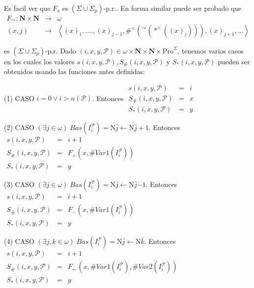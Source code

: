 Es facil ver que \(F_{a}\) es \((\Sigma \cup \Sigma _{p})\)-p.r.. En forma similar puede ser probado que
\(\displaystyle \begin{array}{rll} F_{\curvearrowright }:\mathbf{N}\times \mathbf{N} & \rightarrow & \omega \\ (x,j) & \rightarrow & \left\langle (x)_{1},....,(x)_{j-1},\#^{< }(^{\curvearrowright }(\ast ^{< }((x)_{j}))),(x)_{j+1},...\right\rangle \end{array} \)

es \((\Sigma \cup \Sigma _{p})\)-p.r.
Dado \((i,x,y,\mathcal{P})\in \omega \times \mathbf{N}\times \mathbf{N}\times \mathrm{Pro}^{\Sigma }\), tenemos varios casos en los cuales los valores \( s(i,x,y,\mathcal{P}),S_{\#}(i,x,y,\mathcal{P})\) y \(S_{\ast }(i,x,y,\mathcal{P })\) pueden ser obtenidos usando las funciones antes definidas:

(1) CASO \(i=0\vee i >n(\mathcal{P})\). Entonces
\(\displaystyle \begin{array}{rcl} s(i,x,y,\mathcal{P}) & =& i \\ S_{\#}(i,x,y,\mathcal{P}) & =& x \\ S_{\ast }(i,x,y,\mathcal{P}) & =& y \end{array} \)

(2) CASO \((\exists j\in \omega )\;Bas(I_{i}^{\mathcal{P}})=\mathrm{N} \bar{j}\leftarrow \mathrm{N}\bar{j}+1\). Entonces
\(\displaystyle \begin{array}{rcl} s(i,x,y,\mathcal{P}) & =& i+1 \\ S_{\#}(i,x,y,\mathcal{P}) & =& F_{+}(x,\#Var1(I_{i}^{\mathcal{P}})) \\ S_{\ast }(i,x,y,\mathcal{P}) & =& y \end{array} \)

(3) CASO \((\exists j\in \omega )\;Bas(I_{i}^{\mathcal{P}})=\mathrm{N} \bar{j}\leftarrow \mathrm{N}\bar{j}\dot{-}1\). Entonces
\(\displaystyle \begin{array}{rcl} s(i,x,y,\mathcal{P}) & =& i+1 \\ S_{\#}(i,x,y,\mathcal{P}) & =& F_{\dot{-}}(x,\#Var1(I_{i}^{\mathcal{P}})) \\ S_{\ast }(i,x,y,\mathcal{P}) & =& y \end{array} \)

(4) CASO \((\exists j,k\in \omega )\;Bas(I_{i}^{\mathcal{P}})=\mathrm{N }\bar{j}\leftarrow \mathrm{N}\bar{k}\). Entonces
\(\displaystyle \begin{array}{rcl} s(i,x,y,\mathcal{P}) & =& i+1 \\ S_{\#}(i,x,y,\mathcal{P}) & =& F_{\leftarrow }(x,\#Var1(I_{i}^{\mathcal{P} }),\#Var2(I_{i}^{\mathcal{P}})) \\ S_{\ast }(i,x,y,\mathcal{P}) & =& y \end{array} \)


